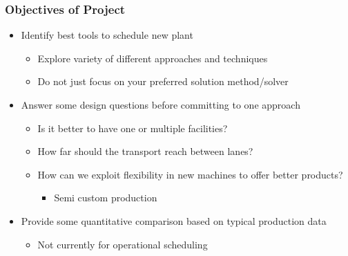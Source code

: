 \begin{frame}
\frametitle{Objectives of Project}
\begin{itemize}
\item Identify best tools to schedule new plant
\begin{itemize}
\item Explore variety of different approaches and techniques
\item Do not just focus on your preferred solution method/solver
\end{itemize}

\item Answer some design questions before committing to one approach
\begin{itemize}
\item Is it better to have one or multiple facilities?
\item How far should the transport reach between lanes?
\item How can we exploit flexibility in new machines to offer better products?
\begin{itemize}
\item Semi custom production
\end{itemize}
\end{itemize}

\item Provide some quantitative comparison based on typical production data
\begin{itemize}
\item Not currently for operational scheduling
\end{itemize}

\end{itemize}
\end{frame}



